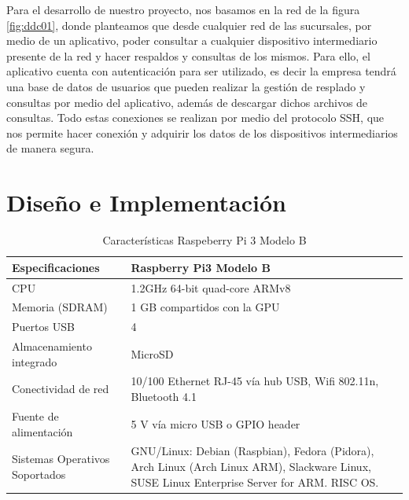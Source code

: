 \documentclass[conference]{IEEEtran}
\begin{document}
Para el desarrollo de nuestro proyecto, nos basamos en la red de la figura \ref{fig:ddc01}, donde planteamos que desde cualquier red de las sucursales, por medio de un aplicativo, poder consultar a cualquier dispositivo intermediario presente de la red y hacer respaldos y consultas de los mismos. Para ello, el aplicativo cuenta con autenticación para ser utilizado, es decir la empresa tendrá una base de datos de usuarios que pueden realizar la gestión de resplado y consultas por medio del aplicativo, además de descargar dichos archivos de consultas. Todo estas conexiones se realizan por medio del protocolo SSH, que nos permite hacer conexión y adquirir los datos de los dispositivos intermediarios de manera segura. 

\section{Diseño e Implementación}

\begin{table}[tbp]
\begin{center}
	\begin{tabular}{|p{2.5cm}|p{5.5cm}|}
	\hline
	\textbf{Especificaciones} &\textbf{Raspberry Pi3 Modelo B} \\ \hline
	CPU  &1.2GHz 64-bit quad-core ARMv8 \\\hline
	Memoria (SDRAM) &1 GB compartidos con la GPU \\\hline
	Puertos USB &4 \\\hline
	Almacenamiento integrado &MicroSD \\\hline
	Conectividad de red &10/100 Ethernet RJ-45 vía hub USB, Wifi 802.11n, Bluetooth 4.1 \\\hline
	Fuente de alimentación &5 V vía micro USB o GPIO header \\\hline
	Sistemas Operativos Soportados &GNU/Linux: Debian (Raspbian), Fedora (Pidora), Arch Linux (Arch Linux ARM), Slackware Linux, SUSE Linux Enterprise Server for ARM. RISC OS.\\\hline
\end{tabular}\vspace{0.25cm}
\caption{Características Raspeberry Pi 3 Modelo B}
\label{tab:rb01}
\end{center}
\end{table}
\end{document}
